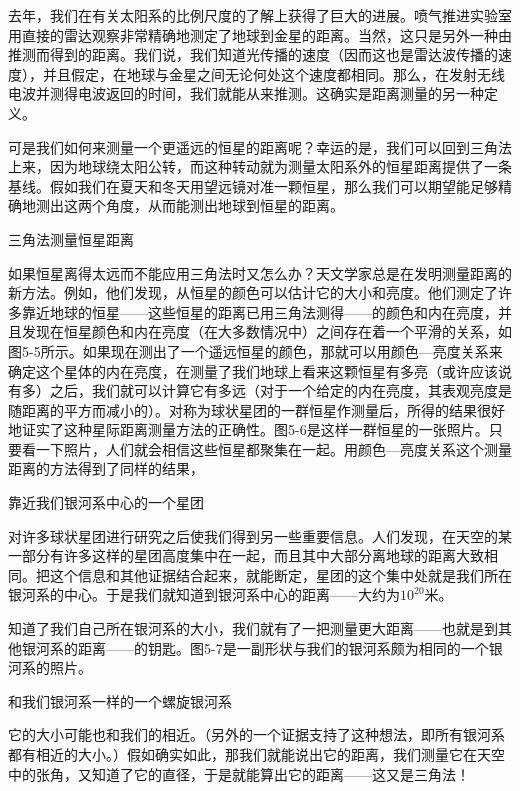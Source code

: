\documentclass[12pt,oneside]{book}
\begin{document}
去年，我们在有关太阳系的比例尺度的了解上获得了巨大的进展。喷气推进实验室用直接的雷达观察非常精确地测定了地球到金星的距离。当然，这只是另外一种由推测而得到的距离。我们说，我们知道光传播的速度（因而这也是雷达波传播的速度），并且假定，在地球与金星之间无论何处这个速度都相同。那么，在发射无线电波并测得电波返回的时间，我们就能从来推测。这确实是距离测量的另一种定义。

可是我们如何来测量一个更遥远的恒星的距离呢？幸运的是，我们可以回到三角法上来，因为地球绕太阳公转，而这种转动就为测量太阳系外的恒星距离提供了一条基线。假如我们在夏天和冬天用望远镜对准一颗恒星，那么我们可以期望能足够精确地测出这两个角度，从而能测出地球到恒星的距离。
\begin{fig}{三角法测量恒星距离}
\caption{\footnotesize 利用地球轨道的直径作为基线，可以用三角法测量靠近地球的恒星的距离}
\label{fig:三角法测量恒星距离}
\end{fig}

如果恒星离得太远而不能应用三角法时又怎么办？天文学家总是在发明测量距离的新方法。例如，他们发现，从恒星的颜色可以估计它的大小和亮度。他们测定了许多靠近地球的恒星——这些恒星的距离已用三角法测得——的颜色和内在亮度，并且发现在恒星颜色和内在亮度（在大多数情况中）之间存在着一个平滑的关系，如图5-5所示。如果现在测出了一个遥远恒星的颜色，那就可以用颜色—亮度关系来确定这个星体的内在亮度，在测量了我们地球上看来这颗恒星有多亮（或许应该说有多）之后，我们就可以计算它有多远（对于一个给定的内在亮度，其表观亮度是随距离的平方而减小的）。对称为球状星团的一群恒星作测量后，所得的结果很好地证实了这种星际距离测量方法的正确性。图5-6是这样一群恒星的一张照片。只要看一下照片，人们就会相信这些恒星都聚集在一起。用颜色—亮度关系这个测量距离的方法得到了同样的结果，
\begin{fig}[2.5]{靠近我们银河系中心的一个星团}
\caption{\footnotesize 靠近我们银河系中心的一个星团，其中各恒星与地球的距离为30,000光年，或约$ 3\times 10^{20} $米}
\label{fig:靠近我们银河系中心的一个星团}
\end{fig}

对许多球状星团进行研究之后使我们得到另一些重要信息。人们发现，在天空的某一部分有许多这样的星团高度集中在一起，而且其中大部分离地球的距离大致相同。把这个信息和其他证据结合起来，就能断定，星团的这个集中处就是我们所在银河系的中心。于是我们就知道到银河系中心的距离——大约为$ 10^{20} $米。

知道了我们自己所在银河系的大小，我们就有了一把测量更大距离——也就是到其他银河系的距离——的钥匙。图5-7是一副形状与我们的银河系颇为相同的一个银河系的照片。
\begin{fig}[2.5]{和我们银河系一样的一个螺旋银河系}
\caption{\footnotesize 和我们银河系一样的一个螺旋银河系，假定它的直径与我们银河系相近，那么我们从它的表观大小就能算出它的距离。它离地球约3000万光年（即$ 3\times 10^{23} $米）}
\label{fig:和我们银河系一样的一个螺旋银河系}
\end{fig}
它的大小可能也和我们的相近。（另外的一个证据支持了这种想法，即所有银河系都有相近的大小。）假如确实如此，那我们就能说出它的距离，我们测量它在天空中的张角，又知道了它的直径，于是就能算出它的距离——这又是三角法！
\end{document}
